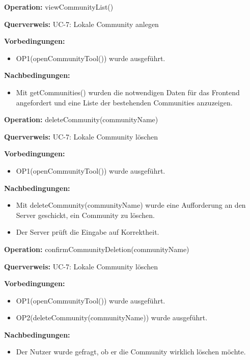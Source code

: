 \documentclass[a4paper,12pt]{article}
\begin{document}
	\begin{contractbox}
		\textbf{Operation:} viewCommunityList()
		
			\textbf{Querverweis:} UC-7: Lokale Community anlegen
		
		\textbf{Vorbedingungen:}
		\begin{itemize}[noitemsep]
			\item OP1(openCommunityTool()) wurde ausgeführt.
		\end{itemize}
		
		\textbf{Nachbedingungen:}
		\begin{itemize}[noitemsep]
			\item Mit getCommunities() wurden die notwendigen Daten für das Frontend angefordert und eine Liste der bestehenden Communities anzuzeigen.
		\end{itemize}
	\end{contractbox}

	\begin{contractbox}
		\textbf{Operation:} deleteCommunity(communityName)
		
			\textbf{Querverweis:} UC-7: Lokale Community löschen
		
		\textbf{Vorbedingungen:}
		\begin{itemize}[noitemsep]
			\item OP1(openCommunityTool()) wurde ausgeführt.
		\end{itemize}
		
		\textbf{Nachbedingungen:}
		\begin{itemize}[noitemsep]
			\item Mit deleteCommunity(communityName) wurde eine Aufforderung an den Server geschickt, ein Community zu löschen.
			\item Der Server prüft die Eingabe auf Korrektheit.
		\end{itemize}
	\end{contractbox}

	\begin{contractbox}
		\textbf{Operation:} confirmCommunityDeletion(communityName)
		
			\textbf{Querverweis:} UC-7: Lokale Community löschen
		
		\textbf{Vorbedingungen:}
		\begin{itemize}[noitemsep]
			\item OP1(openCommunityTool()) wurde ausgeführt.
			\item OP2(deleteCommunity(communityName)) wurde ausgeführt.
		\end{itemize}
		
		\textbf{Nachbedingungen:}
		\begin{itemize}[noitemsep]
			\item Der Nutzer wurde gefragt, ob er die Community wirklich löschen möchte.
		\end{itemize}
	\end{contractbox}
\end{document}

